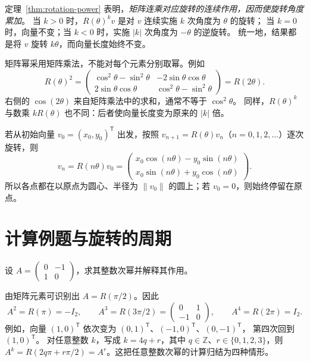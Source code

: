 \documentclass[UTF8,12pt,a4paper,fontset=fandol]{ctexart}
\begin{document}
定理~\ref{thm:rotation-power} 表明，\emph{矩阵连乘对应旋转的连续作用，因而使旋转角度累加}。
当 $k>0$ 时，$R(\theta)^kv$ 是对 $v$ 连续实施 $k$ 次角度为 $\theta$ 的旋转；
当 $k=0$ 时，向量不变；当 $k<0$ 时，实施 $|k|$ 次角度为 $-\theta$ 的逆旋转。
统一地，结果都是将 $v$ 旋转 $k\theta$，而向量长度始终不变。

矩阵幂采用矩阵乘法，不能对每个元素分别取幂。例如
\[
  R(\theta)^2
  =\begin{pmatrix}
    \cos^2\theta-\sin^2\theta&-2\sin\theta\cos\theta\\
    2\sin\theta\cos\theta&\cos^2\theta-\sin^2\theta
  \end{pmatrix}
  =R(2\theta).
\]
右侧的 $\cos(2\theta)$ 来自矩阵乘法中的求和，通常不等于 $\cos^2\theta$。
同样，$R(\theta)^k$ 与数乘 $kR(\theta)$ 也不同：后者使向量长度变为原来的 $|k|$ 倍。

若从初始向量 $v_0=(x_0,y_0)^{\mathsf T}$ 出发，按照
$v_{n+1}=R(\theta)v_n$（$n=0,1,2,\ldots$）逐次旋转，则
\begin{equation}
  v_n=R(n\theta)v_0
  =\begin{pmatrix}
    x_0\cos(n\theta)-y_0\sin(n\theta)\\
    x_0\sin(n\theta)+y_0\cos(n\theta)
  \end{pmatrix}.
  \label{eq:rotation-orbit}
\end{equation}
所以各点都在以原点为圆心、半径为 $\|v_0\|$ 的圆上；若 $v_0=0$，则始终停留在原点。

\section{计算例题与旋转的周期}

\begin{example}[逆时针旋转直角]
设 $A=\begin{pmatrix}0&-1\\1&0\end{pmatrix}$，求其整数次幂并解释其作用。
\end{example}

\begin{solve}
由矩阵元素可识别出 $A=R(\pi/2)$。因此
\[
  A^2=R(\pi)=-I_2,\qquad
  A^3=R(3\pi/2)=\begin{pmatrix}0&1\\-1&0\end{pmatrix},\qquad
  A^4=R(2\pi)=I_2.
\]
例如，向量 $(1,0)^{\mathsf T}$ 依次变为
$(0,1)^{\mathsf T}$、$(-1,0)^{\mathsf T}$、$(0,-1)^{\mathsf T}$，
第四次回到 $(1,0)^{\mathsf T}$。
对任意整数 $k$，写成 $k=4q+r$，其中 $q\in\mathbb Z$、$r\in\{0,1,2,3\}$，则
$A^k=R(2q\pi+r\pi/2)=A^r$。这把任意整数次幂的计算归结为四种情形。
\end{solve}
\end{document}
